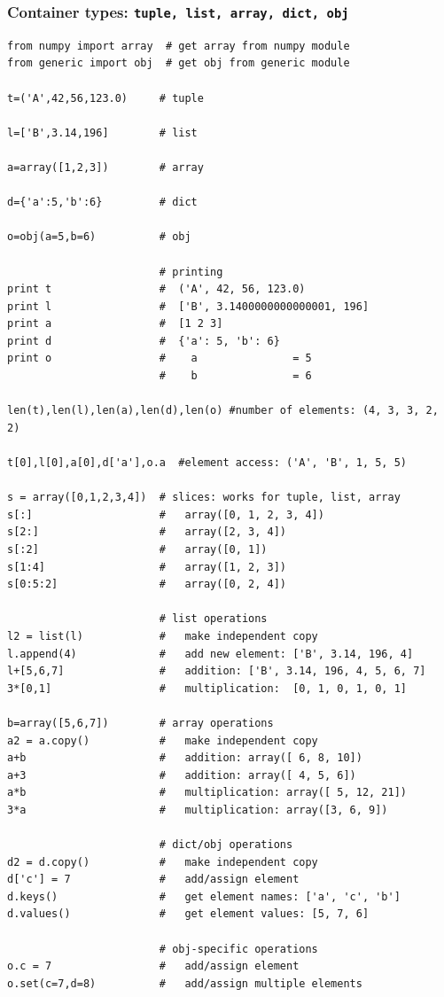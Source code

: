  
\subsubsection{Container types: \texttt{tuple, list, array, dict, obj}}
\begin{shaded}
\begin{verbatim}
from numpy import array  # get array from numpy module
from generic import obj  # get obj from generic module

t=('A',42,56,123.0)     # tuple

l=['B',3.14,196]        # list

a=array([1,2,3])        # array

d={'a':5,'b':6}         # dict

o=obj(a=5,b=6)          # obj

                        # printing
print t                 #  ('A', 42, 56, 123.0)
print l                 #  ['B', 3.1400000000000001, 196]
print a                 #  [1 2 3]
print d                 #  {'a': 5, 'b': 6}
print o                 #    a               = 5
                        #    b               = 6

len(t),len(l),len(a),len(d),len(o) #number of elements: (4, 3, 3, 2, 2)

t[0],l[0],a[0],d['a'],o.a  #element access: ('A', 'B', 1, 5, 5)

s = array([0,1,2,3,4])  # slices: works for tuple, list, array
s[:]                    #   array([0, 1, 2, 3, 4])
s[2:]                   #   array([2, 3, 4])
s[:2]                   #   array([0, 1])
s[1:4]                  #   array([1, 2, 3])
s[0:5:2]                #   array([0, 2, 4])

                        # list operations
l2 = list(l)            #   make independent copy
l.append(4)             #   add new element: ['B', 3.14, 196, 4]
l+[5,6,7]               #   addition: ['B', 3.14, 196, 4, 5, 6, 7]
3*[0,1]                 #   multiplication:  [0, 1, 0, 1, 0, 1]

b=array([5,6,7])        # array operations
a2 = a.copy()           #   make independent copy
a+b                     #   addition: array([ 6, 8, 10])
a+3                     #   addition: array([ 4, 5, 6])
a*b                     #   multiplication: array([ 5, 12, 21])
3*a                     #   multiplication: array([3, 6, 9])

                        # dict/obj operations
d2 = d.copy()           #   make independent copy
d['c'] = 7              #   add/assign element 
d.keys()                #   get element names: ['a', 'c', 'b']
d.values()              #   get element values: [5, 7, 6]

                        # obj-specific operations
o.c = 7                 #   add/assign element
o.set(c=7,d=8)          #   add/assign multiple elements

\end{verbatim}
\end{shaded}

